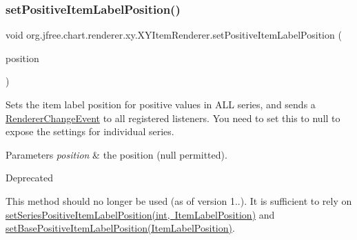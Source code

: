 \mbox{\label{interfaceorg_1_1jfree_1_1chart_1_1renderer_1_1xy_1_1_x_y_item_renderer_ac7ef9149bff4cecf5acc82e9195922df}} 
\subsubsection{\texorpdfstring{set\+Positive\+Item\+Label\+Position()}{setPositiveItemLabelPosition()}\hspace{0.1cm}{\footnotesize\ttfamily [1/2]}}
{\footnotesize\ttfamily void org.\+jfree.\+chart.\+renderer.\+xy.\+X\+Y\+Item\+Renderer.\+set\+Positive\+Item\+Label\+Position (\begin{DoxyParamCaption}\item[{\mbox{\hyperlink{classorg_1_1jfree_1_1chart_1_1labels_1_1_item_label_position}{Item\+Label\+Position}}}]{position }\end{DoxyParamCaption})}

Sets the item label position for positive values in A\+LL series, and sends a \mbox{\hyperlink{}{Renderer\+Change\+Event}} to all registered listeners. You need to set this to {\ttfamily null} to expose the settings for individual series.


\begin{DoxyParams}{Parameters}
{\em position} & the position ({\ttfamily null} permitted).\\
\hline
\end{DoxyParams}
\begin{DoxyRefDesc}{Deprecated}
\item[\mbox{\hyperlink{deprecated__deprecated000234}{Deprecated}}]This method should no longer be used (as of version 1..). It is sufficient to rely on \mbox{\hyperlink{interfaceorg_1_1jfree_1_1chart_1_1renderer_1_1xy_1_1_x_y_item_renderer_a7a1e864e31d83a6f87499e6be32f66e7}{set\+Series\+Positive\+Item\+Label\+Position(int, Item\+Label\+Position)}} and \mbox{\hyperlink{interfaceorg_1_1jfree_1_1chart_1_1renderer_1_1xy_1_1_x_y_item_renderer_ad075045810d227c773e0ad296ad5b4dd}{set\+Base\+Positive\+Item\+Label\+Position(\+Item\+Label\+Position)}}. \end{DoxyRefDesc}
\mbox{\label{interfaceorg_1_1jfree_1_1chart_1_1renderer_1_1xy_1_1_x_y_item_renderer_a01118cdad6c5fc7ac2568508d4c99744}} 
